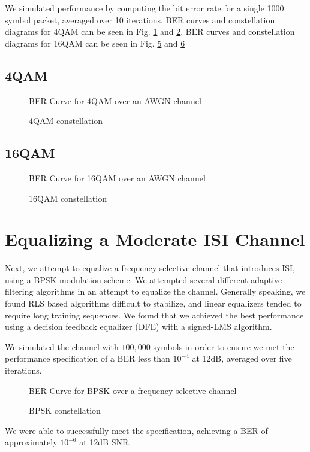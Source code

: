 \documentclass[conference]{IEEEtran}
\begin{document}
We simulated performance by computing the bit error rate for a single 1000 symbol packet, averaged over 10 iterations. BER curves and constellation diagrams for 4QAM can be seen in Fig. \ref{4ber} and \ref{4star}. BER curves and constellation diagrams for 16QAM can be seen in Fig. \ref{16ber} and \ref{16star}
\subsection{4QAM}
\begin{figure}[htbp]
\caption{BER Curve for 4QAM over an AWGN channel}
\label{4ber}
\end{figure}
\begin{figure}[htbp]
\caption{4QAM constellation}
\label{4star}
\end{figure}
\subsection{16QAM}
\begin{figure}[htbp]
\caption{BER Curve for 16QAM over an AWGN channel}
\label{16ber}
\end{figure}
\begin{figure}[htbp]
\caption{16QAM constellation}
\label{16star}
\end{figure}

\section{Equalizing a Moderate ISI Channel}
Next, we attempt to equalize a frequency selective channel that introduces ISI, using a BPSK modulation scheme. We attempted several different adaptive filtering algorithms in an attempt to equalize the channel. Generally speaking, we found RLS based algorithms difficult to stabilize, and linear equalizers tended to require long training sequences. We found that we achieved the best performance using a decision feedback equalizer (DFE) with a signed-LMS algorithm.

We simulated the channel with $100,000$ symbols in order to ensure we met the performance specification of a BER less than $10^{-4}$ at 12dB, averaged over five iterations. 
\begin{figure}[htbp]
\caption{BER Curve for BPSK over a frequency selective channel}
\label{16ber}
\end{figure}
\begin{figure}[htbp]
\caption{BPSK constellation}
\label{16star}
\end{figure}
We were able to successfully meet the specification, achieving a BER of approximately $10^{-6}$ at 12dB SNR.
\end{document}
